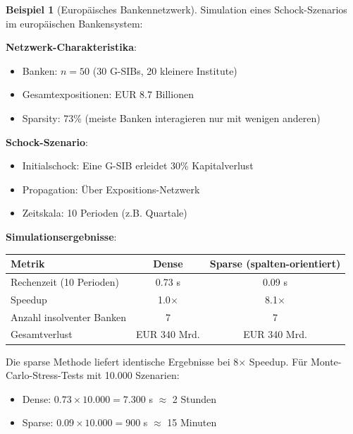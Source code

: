 \documentclass[a4paper,12pt]{report}
\theoremstyle{definition}
\newtheorem{beispiel}{Beispiel}
\begin{document}
	\begin{beispiel}[Europäisches Bankennetzwerk]
		Simulation eines Schock-Szenarios im europäischen Bankensystem:
		
		\textbf{Netzwerk-Charakteristika}:
		\begin{itemize}
			\item Banken: $n = 50$ (30 G-SIBs, 20 kleinere Institute)
			\item Gesamtexpositionen: EUR 8.7 Billionen
			\item Sparsity: 73\% (meiste Banken interagieren nur mit wenigen anderen)
		\end{itemize}
		
		\textbf{Schock-Szenario}:
		\begin{itemize}
			\item Initialschock: Eine G-SIB erleidet 30\% Kapitalverlust
			\item Propagation: Über Expositions-Netzwerk
			\item Zeitskala: 10 Perioden (z.B. Quartale)
		\end{itemize}
		
		\textbf{Simulationsergebnisse}:
		\begin{center}
			\begin{tabular}{|l|c|c|}
				\hline
				\textbf{Metrik} & \textbf{Dense} & \textbf{Sparse (spalten-orientiert)} \\
				\hline
				Rechenzeit (10 Perioden) & 0.73 s & 0.09 s \\
				Speedup & 1.0$\times$ & 8.1$\times$ \\
				Anzahl insolventer Banken & 7 & 7 \\
				Gesamtverlust & EUR 340 Mrd. & EUR 340 Mrd. \\
				\hline
			\end{tabular}
		\end{center}
		
		Die sparse Methode liefert identische Ergebnisse bei 8$\times$ Speedup. Für Monte-Carlo-Stress-Tests mit 10.000 Szenarien:
		\begin{itemize}
			\item Dense: $0.73 \times 10.000 = 7.300$ s $\approx$ 2 Stunden
			\item Sparse: $0.09 \times 10.000 = 900$ s $\approx$ 15 Minuten
		\end{itemize}
	\end{beispiel}
	
\end{document}
